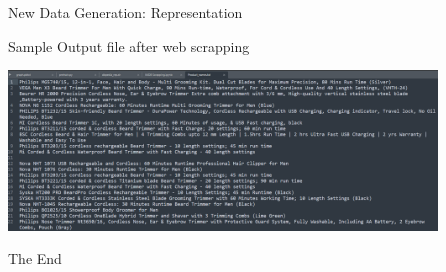 \documentclass[aspectratio=169,xcolor=dvipsnames]{beamer}
\begin{document}



\begin{frame}{New Data Generation: Representation}

         \begin{figure2}
         \caption{Sample Output file after web scrapping}
            \includegraphics[width=430]{Product_listing.png}
            
        \end{figure2}
\end{frame}


\begin{frame}
    \Huge{\centerline{The End}}
\end{frame}

\end{document}
